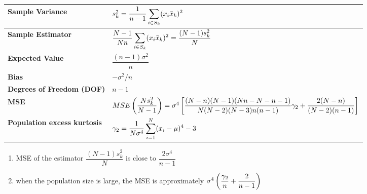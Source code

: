 \begin{alternateColorTable}
\begin{longtable}{|p{2cm}|p{12cm}|}
    \hline

    \textbf{Sample Variance} & \vspace{0.01cm} $
        s_k^2 = \dfrac{1}{n-1}
        \displaystyle\sum_{i\in S_k} (x_i \bar{x}_k)^2
    $ \vspace{0.1cm} \\
    \hline

    \textbf{Sample Estimator} & \vspace{0.01cm} $
        \dfrac{N-1}{Nn} \displaystyle\sum_{i\in S_k}
        (x_i \bar{x}_k)^2
        = \dfrac{(N-1)s_k^2}{N}
    $ \vspace{0.1cm}\\
    \hline

    \textbf{Expected Value} & \vspace{0.01cm} $
        \dfrac{(n-1)\sigma^2}{n}
    $ \vspace{0.1cm} \\
    \hline

    \textbf{Bias} & \vspace{0.01cm} $
        -\sigma^2/n
    $ \vspace{0.1cm} \\
    \hline

    \textbf{Degrees of Freedom (DOF)} & $n-1$\\
    \hline

    \textbf{MSE} & \vspace{0.1cm} $
        MSE\left( \dfrac{Ns_k^2}{N-1} \right)
        = \sigma^4 \left[ 
            \dfrac{
                (N-n)(N-1)(Nn-N-n-1)
            }{
                N(N-2)(N-3)n(n-1)
            }\gamma_2
            + \dfrac{2(N-n)}{(N-2)(n-1)}
        \right]
    $ \vspace{0.1cm} \\
    \hline

    \textbf{Population excess kurtosis} & $
        \gamma_2 = \dfrac{1}{N\sigma^4}
        \displaystyle\sum_{i=1}^{N} (x_i-\mu)^4 - 3
    $\\
    \hline
\end{longtable}
\end{alternateColorTable}

\begin{enumerate}
    \item MSE of the estimator $\dfrac{(N-1)s_k^2}{N}$ is close to $\dfrac{2\sigma^4}{n-1}$

    \item when the population size is large, the MSE is approximately $\sigma^4\left( \dfrac{\gamma_2}{n} + \dfrac{2}{n-1} \right)$
\end{enumerate}


